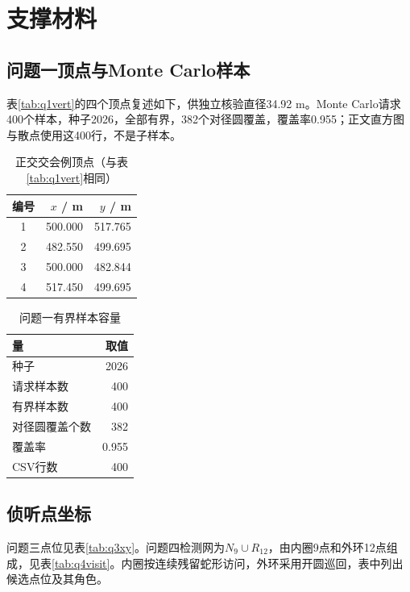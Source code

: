 \documentclass{cumcmthesis}
\begin{document}
\appendix
\section{支撑材料}

\subsection{问题一顶点与Monte Carlo样本}

表\ref{tab:q1vert}的四个顶点复述如下，供独立核验直径34.92 m。Monte Carlo请求400个样本，种子2026，全部有界，382个对径圆覆盖，覆盖率0.955；正文直方图与散点使用这400行，不是子样本。

\begin{table}[htbp]
\centering
\caption{正交交会例顶点（与表\ref{tab:q1vert}相同）}
\label{tab:q1vertapp}
\begin{tabular}{crr}
\toprule
编号 & $x$ / m & $y$ / m \\
\midrule
1 & 500.000 & 517.765 \\
2 & 482.550 & 499.695 \\
3 & 500.000 & 482.844 \\
4 & 517.450 & 499.695 \\
\bottomrule
\end{tabular}
\end{table}

\begin{table}[htbp]
\centering
\caption{问题一有界样本容量}
\label{tab:q1mcmeta}
\begin{tabular}{lr}
\toprule
量 & 取值 \\
\midrule
种子 & 2026 \\
请求样本数 & 400 \\
有界样本数 & 400 \\
对径圆覆盖个数 & 382 \\
覆盖率 & 0.955 \\
CSV行数 & 400 \\
\bottomrule
\end{tabular}
\end{table}


\subsection{侦听点坐标}

问题三点位见表\ref{tab:q3xy}。问题四检测网为$N_9\cup R_{12}$，由内圈9点和外环12点组成，见表\ref{tab:q4visit}。内圈按连续残留蛇形访问，外环采用开圆巡回，表中列出候选点位及其角色。
\end{document}
